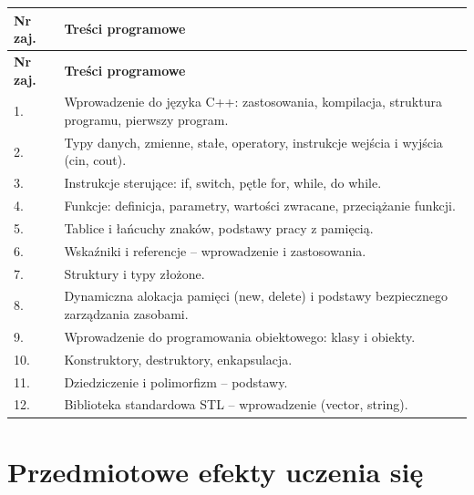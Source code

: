 \documentclass[12pt, a4paper]{article}
\newcommand{\thdrule}{\noalign{\global\setlength{\extrarowheight}{0pt}}}
\newcommand{\thdend}{\noalign{\global\setlength{\extrarowheight}{3pt}}}
\begin{document}
{\scriptsize
\begin{longtable}{m{1.5cm}m{14.5cm}}
\thdrule\toprule
\rowcolor{pjatkRed} {\color{white}\textbf{Nr zaj.}} & {\color{white}\textbf{Treści programowe}} \\
\midrule\thdend
\endfirsthead
\thdrule\toprule
\rowcolor{pjatkRed} {\color{white}\textbf{Nr zaj.}} & {\color{white}\textbf{Treści programowe}} \\
\midrule\thdend
\endhead
  \rowcolor{tableRowLight} 1. & Wprowadzenie do języka C++: zastosowania, kompilacja, struktura programu, pierwszy program. \\
  \rowcolor{tableRowAlt} 2. & Typy danych, zmienne, stałe, operatory, instrukcje wejścia i wyjścia (cin, cout). \\
  \rowcolor{tableRowLight} 3. & Instrukcje sterujące: if, switch, pętle for, while, do while. \\
  \rowcolor{tableRowAlt} 4. & Funkcje: definicja, parametry, wartości zwracane, przeciążanie funkcji. \\
  \rowcolor{tableRowLight} 5. & Tablice i łańcuchy znaków, podstawy pracy z pamięcią. \\
  \rowcolor{tableRowAlt} 6. & Wskaźniki i referencje – wprowadzenie i zastosowania. \\
  \rowcolor{tableRowLight} 7. & Struktury i typy złożone. \\
  \rowcolor{tableRowAlt} 8. & Dynamiczna alokacja pamięci (new, delete) i podstawy bezpiecznego zarządzania zasobami. \\
  \rowcolor{tableRowLight} 9. & Wprowadzenie do programowania obiektowego: klasy i obiekty. \\
  \rowcolor{tableRowAlt} 10. &  Konstruktory, destruktory, enkapsulacja. \\
  \rowcolor{tableRowLight} 11. &  Dziedziczenie i polimorfizm – podstawy. \\
  \rowcolor{tableRowAlt} 12. &  Biblioteka standardowa STL – wprowadzenie (vector, string). \\
\bottomrule
\end{longtable}}

\section{Przedmiotowe efekty uczenia się}
\end{document}
